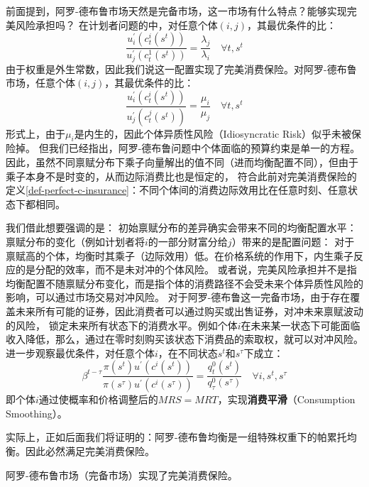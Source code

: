 前面提到，阿罗-德布鲁市场天然是完备市场，这一市场有什么特点？能够实现完美风险承担吗？
在计划者问题的中，对任意个体$(i,j)$，其最优条件的比：
\begin{equation*}
    \frac{u_i^{\prime}\left(c_t^i\left(s^t\right)\right)}{u_j^{\prime}\left(c_t^1\left(s^t\right)\right)}=\frac{\lambda_j}{\lambda_i}
        \quad \forall t, s^t
\end{equation*}
由于权重是外生常数，因此我们说这一配置实现了完美消费保险。对阿罗-德布鲁市场，任意个体$(i,j)$，其最优条件的比：
\begin{equation*}
    \frac{u_i^{\prime}\left(c_t^i\left(s^t\right)\right)}{u_j^{\prime}\left(c_t^j\left(s^t\right)\right)}=\frac{\mu_i}{\mu_j}
        \quad \forall t, s^t
\end{equation*}
形式上，由于$\mu_i$是内生的，因此个体异质性风险（Idiosyncratic Risk）似乎未被保险掉。
但我们已经指出，阿罗-德布鲁问题中个体面临的预算约束是单一的方程。
因此，虽然不同禀赋分布下乘子向量解出的值不同（进而均衡配置不同），但由于乘子本身不是时变的，从而边际消费比也是恒定的，
符合此前对完美消费保险的定义\ref{def-perfect-c-insurance}：不同个体间的消费边际效用比在任意时刻、任意状态下都相同。

我们借此想要强调的是：
初始禀赋分布的差异确实会带来不同的均衡配置水平：禀赋分布的变化（例如计划者将$i$的一部分财富分给$j$）带来的是配置问题：
对于禀赋高的个体，均衡时其乘子（边际效用）低。在价格系统的作用下，内生乘子反应的是分配的效率，而不是未对冲的个体风险。
或者说，完美风险承担并不是指均衡配置不随禀赋分布变化，而是指个体的消费路径不会受未来个体异质性风险的影响，可以通过市场交易对冲风险。
对于阿罗-德布鲁这一完备市场，由于存在覆盖未来所有可能的证券，因此消费者可以通过购买或出售证券，对冲未来禀赋波动的风险，
锁定未来所有状态下的消费水平。例如个体$i$在未来某一状态下可能面临收入降低，那么，通过在零时刻购买该状态下消费品的索取权，就可以对冲风险。
进一步观察最优条件，对任意个体$i$，在不同状态$s^t$和$s^{\tau}$下成立：
\begin{equation}
    \beta^{t-\tau}\frac{\pi\left(s^t\right) u^{\prime}\left(c^i\left(s^t\right)\right)}{\pi\left(s^\tau\right)u^{\prime}\left(c^i\left(s^\tau\right)\right)}
        =\frac{q_t^0\left(s^t\right)}{q_{\tau}^0\left(s^\tau\right)} \quad \forall i, s^t, s^\tau
\end{equation}
即个体$i$通过使概率和价格调整后的$MRS=MRT$，实现\textbf{消费平滑}（Consumption Smoothing）。

实际上，正如后面我们将证明的：阿罗-德布鲁均衡是一组特殊权重下的帕累托均衡。因此必然满足完美消费保险。
\begin{property}
    阿罗-德布鲁市场（完备市场）实现了完美消费保险。
\end{property}

